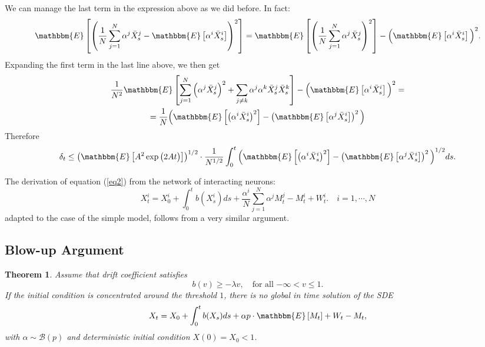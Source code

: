 \documentclass[11pt, a4paper]{article}
\newtheorem{theorem}{Theorem}
\begin{document}
We can manage the last term in the expression above as we did before. In fact: \[ \mathbbm{E} \left[ \left( \frac{1}{N} \sum_{j = 1}^N \alpha^j \bar{X}^j_s - \mathbbm{E} \left[ \alpha^i \bar{X}^i_s \right] \right)^2 \right] = \mathbbm{E} \left[ \left( \frac{1}{N} \sum_{j=1}^N \alpha^j \bar{X}^j_s \right)^2 \right] - \Big( \mathbbm{E} \left[ \alpha^i \bar{X}^i_s \right] \Big)^2. \]
Expanding the first term in the last line above, we then get \begin{multline*} \frac{1}{N^2} \mathbbm{E}\left[ \sum_{j = 1}^N \Big( \alpha^j \bar{X}^j_s \Big)^2 + \sum_{j \neq k} \alpha^j \alpha^k \bar{X}^j_s \bar{X}^k_s \right] - \Big( \mathbbm{E} \left[ \alpha^i \bar{X}^i_s \right] \Big)^2 = \\ = \frac{1}{N} \Big( \mathbbm{E} \left[ \left( \alpha^i \bar{X}^i_s \right)^2 \right] - \left( \mathbbm{E} \left[ \alpha^j \bar{X}^i_s \right] \right)^2 \Big) \end{multline*}
Therefore \[ \delta_t \leq \left( \mathbbm{E} \left[ A^2 \exp \big( 2 A t \big) \right] \right)^{1/2} \cdot \frac{1}{N^{1/2}} \int_0^t \Big( \mathbbm{E} \left[ \left( \alpha^i \bar{X}^i_s \right)^2 \right] - \left( \mathbbm{E} \left[ \alpha^j \bar{X}^i_s \right] \right)^2 \Big)^{1/2} ds. \]

The derivation of equation  (\ref{eq2}) from the network of interacting neurons:
\begin{equation}
 X^i_t = X^i_0 + \int_0^t b(X^i_s) ds + \frac{\alpha^i}{N} \sum_{j = 1}^N \alpha^{j} M^j_t - M^i_t + W^i_t. \quad  i=1,\cdots,N\label{eq:aiaj}
 \end{equation}
adapted to the case of the simple model, follows from a very similar argument.
\subsection{Blow-up Argument}
\begin{theorem}
Assume that drift coefficient satisfies
\[b(v) \geq -\lambda v, \quad \text{for all $-\infty<v\leq1$.}\]
If the initial condition is concentrated around the threshold $1$, there is no global in time solution of the SDE
\begin{equation} \label{limit1} X_t = X_0 + \int_0^t b(X_s) ds + \alpha p \cdot \mathbbm{E} \left[ M_t \right] + W_t - M_t, \end{equation}
with $\alpha\sim\mathcal{B}(p)$ and deterministic initial condition $X(0) = X_0 < 1$.
\end{theorem}
\end{document}
